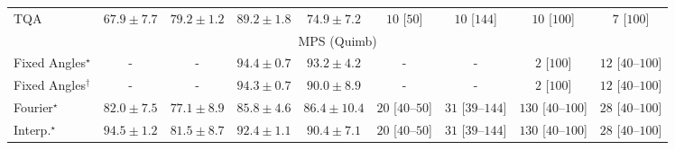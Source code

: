 \begin{tabular}{l|cccc|cccc|}
TQA & {\cellcolor[HTML]{EAF3F8}} \color[HTML]{000000} $67.9\pm 7.7$ & {\cellcolor[HTML]{92A4CD}} \color[HTML]{F1F1F1} $79.2\pm 1.2$ & {\cellcolor[HTML]{852F91}} \color[HTML]{F1F1F1} $89.2\pm 1.8$ & {\cellcolor[HTML]{B0C9E1}} \color[HTML]{000000} $74.9\pm 7.2$ & {\cellcolor[HTML]{FFF6F2}} \color[HTML]{000000} $10$ [$50$] & {\cellcolor[HTML]{FFF6F2}} \color[HTML]{000000} $10$ [$144$] & {\cellcolor[HTML]{FFF6F2}} \color[HTML]{000000} $10$ [$100$] & {\cellcolor[HTML]{FFF6F2}} \color[HTML]{000000} $7$ [$100$] \\
\cline{1-9}
\multicolumn{9}{c}{\rule{0pt}{8pt}MPS (Quimb)} \\
\midrule
Fixed Angles$^\star$ & {\cellcolor[HTML]{000000}} \color[HTML]{F1F1F1} {\cellcolor{white}} \color{black} - & {\cellcolor[HTML]{000000}} \color[HTML]{F1F1F1} {\cellcolor{white}} \color{black} - & {\cellcolor[HTML]{712806}} \color[HTML]{F1F1F1} $94.4\pm 0.7$ & {\cellcolor[HTML]{832D05}} \color[HTML]{F1F1F1} $93.2\pm 4.2$ & {\cellcolor[HTML]{000000}} \color[HTML]{F1F1F1} {\cellcolor{white}} \color{black} - & {\cellcolor[HTML]{000000}} \color[HTML]{F1F1F1} {\cellcolor{white}} \color{black} - & {\cellcolor[HTML]{FFF7F3}} \color[HTML]{000000} $2$ [$100$] & {\cellcolor[HTML]{FFF5F1}} \color[HTML]{000000} $12$ [$40$--$100$] \\
Fixed Angles$^\dagger$ & {\cellcolor[HTML]{000000}} \color[HTML]{F1F1F1} {\cellcolor{white}} \color{black} - & {\cellcolor[HTML]{000000}} \color[HTML]{F1F1F1} {\cellcolor{white}} \color{black} - & {\cellcolor[HTML]{732905}} \color[HTML]{F1F1F1} $94.3\pm 0.7$ & {\cellcolor[HTML]{AE3E03}} \color[HTML]{F1F1F1} $90.0\pm 8.9$ & {\cellcolor[HTML]{000000}} \color[HTML]{F1F1F1} {\cellcolor{white}} \color{black} - & {\cellcolor[HTML]{000000}} \color[HTML]{F1F1F1} {\cellcolor{white}} \color{black} - & {\cellcolor[HTML]{FFF7F3}} \color[HTML]{000000} $2$ [$100$] & {\cellcolor[HTML]{FFF5F1}} \color[HTML]{000000} $12$ [$40$--$100$] \\
Fourier$^\star$ & {\cellcolor[HTML]{F78921}} \color[HTML]{F1F1F1} $82.0\pm 7.5$ & {\cellcolor[HTML]{FEC14C}} \color[HTML]{000000} $77.1\pm 8.9$ & {\cellcolor[HTML]{DE610C}} \color[HTML]{F1F1F1} $85.8\pm 4.6$ & {\cellcolor[HTML]{D95B09}} \color[HTML]{F1F1F1} $86.4\pm 10.4$ & {\cellcolor[HTML]{FFF3F0}} \color[HTML]{000000} $20$ [$40$--$50$] & {\cellcolor[HTML]{FEF1ED}} \color[HTML]{000000} $31$ [$39$--$144$] & {\cellcolor[HTML]{FDD8D5}} \color[HTML]{000000} $130$ [$40$--$100$] & {\cellcolor[HTML]{FEF1ED}} \color[HTML]{000000} $28$ [$40$--$100$] \\
Interp.$^\star$ & {\cellcolor[HTML]{702806}} \color[HTML]{F1F1F1} $94.5\pm 1.2$ & {\cellcolor[HTML]{F98E23}} \color[HTML]{F1F1F1} $81.5\pm 8.7$ & {\cellcolor[HTML]{8E3104}} \color[HTML]{F1F1F1} $92.4\pm 1.1$ & {\cellcolor[HTML]{A93C03}} \color[HTML]{F1F1F1} $90.4\pm 7.1$ & {\cellcolor[HTML]{FFF3F0}} \color[HTML]{000000} $20$ [$40$--$50$] & {\cellcolor[HTML]{FEF1ED}} \color[HTML]{000000} $31$ [$39$--$144$] & {\cellcolor[HTML]{FDD8D5}} \color[HTML]{000000} $130$ [$40$--$100$] & {\cellcolor[HTML]{FEF1ED}} \color[HTML]{000000} $28$ [$40$--$100$] \\

\end{tabular}
